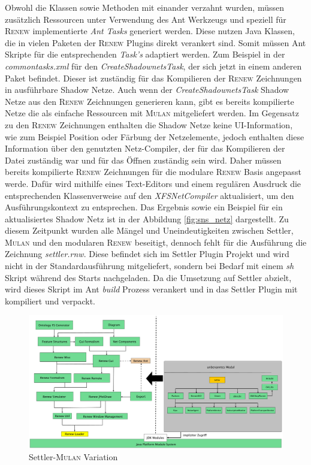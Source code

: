 	Obwohl die Klassen sowie Methoden mit einander verzahnt wurden, müssen zusätzlich Ressourcen unter Verwendung des Ant Werkzeugs und speziell für \textsc{Renew} implementierte \textit{Ant Tasks} generiert werden. Diese nutzen Java Klassen, die in vielen Paketen der \textsc{Renew} Plugins direkt verankert sind. Somit müssen Ant Skripte für die entsprechenden \textit{Task's} adaptiert werden. Zum Beispiel in der \textit{commontasks.xml} für den \textit{CreateShadownetsTask}, der sich jetzt in einem anderen Paket befindet. Dieser ist zuständig für das Kompilieren der \textsc{Renew} Zeichnungen in ausführbare Shadow Netze. Auch wenn der \textit{CreateShadownetsTask} Shadow Netze aus den \textsc{Renew} Zeichnungen generieren kann, gibt es bereits kompilierte Netze die als einfache Ressourcen mit \textsc{Mulan} mitgeliefert werden. \newline
	Im Gegensatz zu den \textsc{Renew} Zeichnungen enthalten die Shadow Netze keine UI-Information, wie zum Beispiel Position oder Färbung der Netzelemente, jedoch enthalten diese Information über den genutzten Netz-Compiler, der für das Kompilieren der Datei zuständig war und für das Öffnen zuständig sein wird. Daher müssen bereits kompilierte \textsc{Renew} Zeichnungen für die modulare \textsc{Renew} Basis angepasst werde. Dafür wird mithilfe eines Text-Editors und einem regulären Ausdruck die entsprechenden Klassenverweise auf den \textit{XFSNetCompiler} aktualisiert, um den Ausführungskontext zu entsprechen. \newline
	Das Ergebnis sowie ein Beispiel für ein aktualisiertes Shadow Netz ist in der Abbildung \ref{fig:sns_netz} dargestellt. \bigbreak
	Zu diesem Zeitpunkt wurden alle Mängel und Uneindeutigkeiten zwischen Settler, \textsc{Mulan} und den modularen \textsc{Renew} beseitigt, dennoch fehlt für die Ausführung die Zeichnung \textit{settler.rnw}. Diese befindet sich im Settler Plugin Projekt und wird nicht in der Standardausführung mitgeliefert, sondern bei Bedarf mit einem \textit{sh} Skript während des Starts nachgeladen. \newline
	Da die Umsetzung auf Settler abzielt, wird dieses Skript im Ant \textit{build} Prozess verankert und in das Settler Plugin mit kompiliert und verpackt. \newline

	\begin{figure}[h!]
	  \centering
	  \includegraphics[width=\textwidth]{material/images/settler-renew-mulan-vm.pdf}
	  \caption{Settler-\textsc{Mulan} Variation}
	  \label{fig:trans_config}
	\end{figure}

